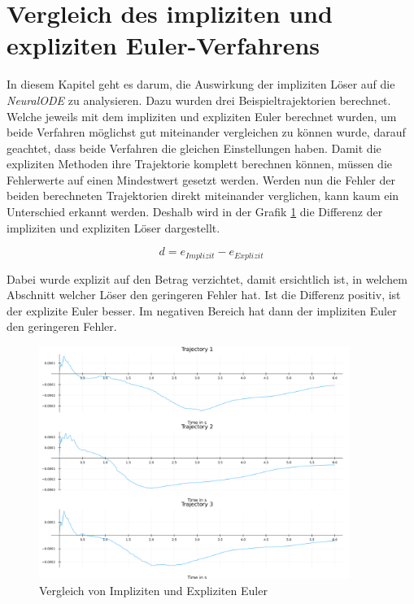 
\section{Vergleich des impliziten und expliziten Euler-Verfahrens}

In diesem Kapitel geht es darum, die Auswirkung der impliziten Löser auf die \textit{NeuralODE} zu analysieren.
Dazu wurden drei Beispieltrajektorien berechnet.
Welche jeweils mit dem impliziten und expliziten Euler berechnet wurden,
um beide Verfahren möglichst gut miteinander vergleichen zu können wurde, darauf geachtet, dass beide Verfahren die gleichen Einstellungen haben.
Damit die expliziten Methoden
ihre Trajektorie komplett berechnen können, 
müssen die Fehlerwerte auf einen Mindestwert gesetzt werden.
Werden nun die Fehler der beiden berechneten Trajektorien
direkt miteinander verglichen, kann kaum ein Unterschied erkannt werden.
Deshalb wird in der Grafik \ref{fig:eulervergleich}
die Differenz der impliziten und expliziten Löser dargestellt.

$$
d = e_{Implizit} - e_{Explizit}
$$

Dabei wurde explizit auf den Betrag verzichtet, damit ersichtlich ist, in welchem Abschnitt welcher Löser den geringeren Fehler hat.
Ist die Differenz positiv, 
ist der explizite Euler besser.
Im negativen Bereich hat dann der impliziten Euler den geringeren Fehler.

\begin{figure}[H] 
\includegraphics[width=0.9\textwidth]{Data/03_Ergebnisse/errors.png}
\caption{Vergleich von Impliziten und Expliziten Euler}
\label{fig:eulervergleich}
\end{figure}

